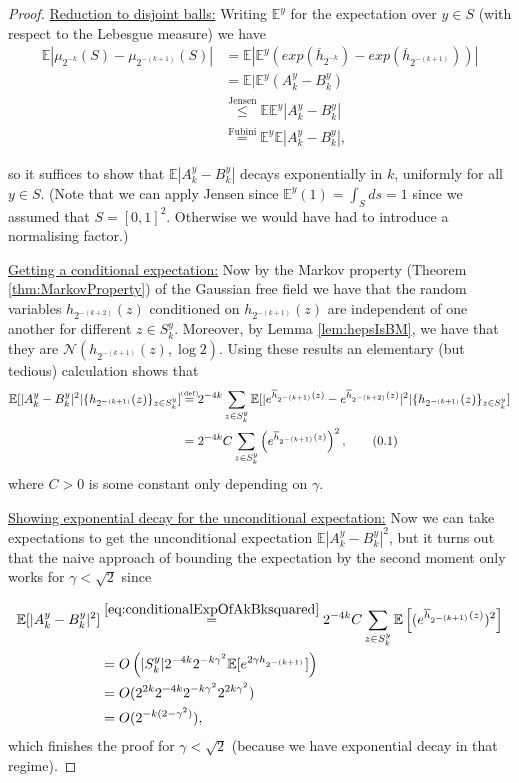 \documentclass[11pt,reqno]{amsart}
\numberwithin{equation}{section}
\newcommand{\eqby}[1]{\mathrel{\stackrel{#1}{=}}}
\newcommand{\eqbydef}{\mathrel{\stackrel{\hspace*{-3mm}\text{\tiny(def)}\hspace*{-3mm}}{=}}}
\newcommand{\leqby}[1]{\mathrel{\stackrel{#1}{\leq}}}
\newcommand\numberthis{\addtocounter{equation}{1}\tag{\theequation}} %
\renewcommand\theequation{{\thesection}%
                   .{\arabic{equation}}}
\begin{document}
\begin{proof}
	\underline{Reduction to disjoint balls:} Writing $\mathbb E^y$ for the expectation over $y\in S$ (with respect to the Lebesgue measure) we have \begin{align*}
		\mathbb E|\mu_{2^{-k}}(S)-\mu_{2^{-(k+1)}}(S)| &= \mathbb E|\mathbb E^y(exp(\overline h_{2^{-k}})-exp(\overline h_{2^{-(k+1)}}))|\\
		&=\mathbb E|\mathbb E^y(A_k^y-B_k^y)\\
		&\leqby{\text{Jensen}}\mathbb E\mathbb E^y|A_k^y-B_k^y|\\
		&\eqby{\text{Fubini}}\mathbb E^y\mathbb E|A_k^y-B_k^y|,
	\end{align*}
	
	so it suffices to show that $\mathbb E|A_k^y-B_k^y|$ decays exponentially in $k$, uniformly for all $y\in S$. (Note that we can apply Jensen since $\mathbb E^y(1)=\int_S ds=1$ since we assumed that $S=[0,1]^2$. Otherwise we would have had to introduce a normalising factor.)
	
	\underline{Getting a conditional expectation:} Now by the Markov property (Theorem \ref{thm:MarkovProperty}) of the Gaussian free field we have that the random variables $h_{2^{-(k+2)}}(z)$ conditioned on $h_{2^{-(k+1)}}(z)$ are independent of one another for different $z\in S_k^y$. Moreover, by Lemma \ref{lem:hepsIsBM}, we have that they are $\mathcal N(h_{2^{-(k+1)}}(z),\log 2)$. Using these results an elementary (but tedious) calculation shows that
	\begin{align*}
		\mathbb E[|A_k^y-B_k^y|^2|\{h_{2^{-(k+1)}}(z)\}_{z\in S_k^y}] &\eqbydef 2^{-4k}\sum_{z\in S_k^y}\mathbb E[|e^{\overline h_{2^{-(k+1)}}(z)}-e^{\overline h_{2^{-(k+2)}}(z)}|^2|\{h_{2^{-(k+1)}}(z)\}_{z\in S_k^y}]\\
		&=2^{-4k}C\sum_{z\in S_k^y}\left(e^{\overline h_{2^{-(k+1)}}(z)}\right)^2,\numberthis \label{eq:conditionalExpOfAkBksquared}
	\end{align*}
	where $C>0$ is some constant only depending on $\gamma$.
	
	\underline{Showing exponential decay for the unconditional expectation:} Now we can take expectations to get the unconditional expectation $\mathbb E|A_k^y-B_k^y|^2$, but it turns out that the naive approach of bounding the expectation by the second moment only works for $\gamma<\sqrt 2$ since
	
	\begin{align*}
		\mathbb E[|A_k^y-B_k^y|^2] &\eqby{\eqref{eq:conditionalExpOfAkBksquared}}
		2^{-4k}C\sum_{z\in S_k^y}\mathbb E\left[(e^{\overline h_{2^{-(k+1)}}(z)})^2\right]\\
		&= O\left(|S_k^y|2^{-4k}2^{-k\gamma^2}\mathbb E[e^{2\gamma h_{2^{-(k+1)}}}]\right) \\
		&= O(2^{2k}2^{-4k}2^{-k\gamma^2}2^{2k\gamma^2})\\
		&= O(2^{-k(2-\gamma^2)}),
	\end{align*}
	which finishes the proof for $\gamma<\sqrt 2$ (because we have exponential decay in that regime).
	

\end{proof}
\end{document}
